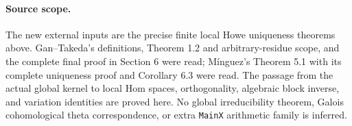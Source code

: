 \paragraph{Source scope.}
The new external inputs are the precise finite local
Howe uniqueness theorems above.  Gan--Takeda's
definitions, Theorem 1.2 and arbitrary-residue scope,
and the complete final proof in Section 6 were
read; M\'inguez's Theorem 5.1 with its complete
uniqueness proof and Corollary 6.3 were read.
The passage from the actual global kernel to local
Hom spaces, orthogonality, algebraic block inverse,
and variation identities are proved here.
No global irreducibility theorem, Galois
cohomological theta correspondence, or extra
\texttt{MainX} arithmetic family is inferred.
